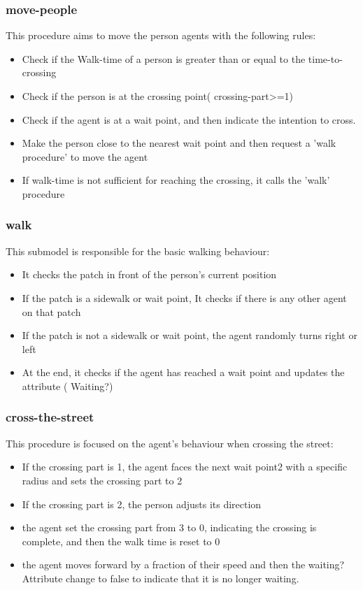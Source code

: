 \documentclass[10pt]{report}
\numberwithin{figure}{section}
\numberwithin{table}{section}
\begin{document}
\subsubsection{move-people}
This procedure aims to move the person agents with the following rules:

\begin{itemize}
    \item Check if the Walk-time of a person is greater than or equal to the time-to-crossing
    \item Check if the person is at the crossing point( crossing-part>=1)
    \item Check if the agent is at a wait point, and then indicate the intention to cross.
    \item  Make the person close to the nearest wait point and then request a 'walk procedure' to move the agent
    \item  If walk-time is not sufficient for reaching the crossing, it calls the 'walk' procedure
\end{itemize}

\subsubsection{walk}
This submodel is responsible for the basic walking behaviour:

\begin{itemize}
    \item It checks the patch in front of the person's current position
    \item If the patch is a sidewalk or wait point, It checks if there is any other agent on that patch
    \item If the patch is not a sidewalk or wait point, the agent randomly turns right or left 
    \item At the end, it checks if the agent has reached a wait point and updates the attribute ( Waiting?)
\end{itemize}


\subsubsection{cross-the-street}

This procedure is focused on the agent's behaviour when crossing the street:
\begin{itemize}
    \item If the crossing part is 1, the agent faces the next wait point2 with a specific radius and sets the crossing part to 2
    \item If the crossing part is 2, the person adjusts its direction
    \item the agent set the crossing part from 3 to 0, indicating the crossing is complete, and then the walk time is reset to 0
    \item the agent moves forward by a fraction of their speed and then the waiting? Attribute change to false to indicate that it is no longer waiting.
\end{itemize}
\end{document}
